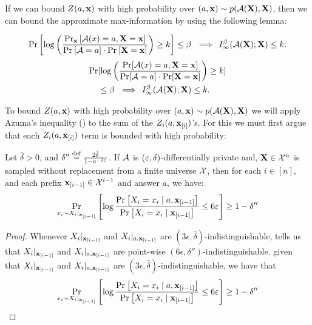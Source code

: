If we can bound $Z(a,\mathbf{x})$ with high probability over $(a,\mathbf{x}) \sim p(\mathcal{A}(\mathbf{X}),\mathbf{X})$, then we can bound the approximate max-information by using the following lemma:

\begin{lemma}
\ifnum{}
$$\operatorname*{\mathrm{Pr}}_{}\left[\log \left( \dfrac
{\operatorname*{\mathrm{Pr}}_{\mathbf{x}}\left[\mathcal{A}(x)=a, \mathbf{X}=\mathbf{x}\right]}
{\operatorname*{\mathrm{Pr}}_{}\left[\mathcal{A} = a\right] \cdot \operatorname*{\mathrm{Pr}}_{}\left[\mathbf{X}=\mathbf{x}\right]}
\right) \geq k\right] \leq \beta \,\,\implies\, I_\infty^\beta(\mathcal{A}(\mathbf{X});\mathbf{X}) \leq k.$$
\else
\begin{align*}
\Pr&[\log \left( \dfrac
{\Pr[\mathcal{A}(x)=a, \mathbf{X}=\mathbf{x}]}
{\Pr[\mathcal{A} = a] \cdot \Pr[\mathbf{X}=\mathbf{x}]}
\right) \geq k] \\
& \leq \beta \,\,\implies\, I_\infty^\beta(\mathcal{A}(\mathbf{X});\mathbf{X}) \leq k.
\end{align*}
\fi
\label{lem:boundmaxinfo}
\end{lemma}

To bound $Z(a,\mathbf{x})$ with high probability over $(a,\mathbf{x}) \sim p(\mathcal{A}(\mathbf{X}),\mathbf{X})$ we will apply Azuma's inequality () to the sum of the $Z_i(a,\mathbf{x}_{[i]})$'s. For this we must first argue that each $Z_i(a,\mathbf{x}_{[i]})$ term is bounded with high probability:
\begin{claim}\label{claim:zibound}
Let $\hat\delta>0$, and $\delta'' \stackrel{\text{def}}{=} \tfrac{2\hat\delta}{1-e^{-3\varepsilon}}$.
If $\mathcal{A}$ is $(\varepsilon,\delta)$-differentially private and, $\mathbf{X} \in \mathcal{X}^n$ is sampled without replacement from a finite universe $\mathcal{X}$, then for each $i \in [n]$, and each prefix $\mathbf{x}_{[i-1]}\in \mathcal{X}^{i-1}$ and answer $a$, we have:
    $$
\operatorname*{\mathrm{Pr}}_{x_i \sim X_i |_{\mathbf{x}_{[i-1]}}}\left[\log\dfrac{\operatorname*{\mathrm{Pr}}_{}\left[X_i = x_i \mid a, \mathbf{x}_{[i-1]}\right]}{\operatorname*{\mathrm{Pr}}_{}\left[X_i = x_i\mid \mathbf{x}_{[i-1]}\right]} \leq 6 \varepsilon \right] \geq 1 - \delta''
$$
\label{claim:Fi}
\end{claim}

\begin{proof}
    Whenever $X_i|_{\mathbf{x}_{[i-1]}}$ and $X_i|_{a,\mathbf{x}_{[i-1]}}$ are $\left(3 \epsilon, \hat{\delta} \right)$-indistinguishable,  tells us that $X_i|_{\mathbf{x}_{[i-1]}}$ and $X_i|_{a,\mathbf{x}_{[i-1]}}$ are point-wise $\left(6 \epsilon, \delta'' \right)$-indistinguishable. \ie given that $X_i|_{\mathbf{x}_{[i-1]}}$ and $X_i|_{a,\mathbf{x}_{[i-1]}}$ are $\left(3 \epsilon, \hat{\delta} \right)$-indistinguishable, we have that 
$$
\operatorname*{\mathrm{Pr}}_{x_i \sim X_i |_{\mathbf{x}_{[i-1]}}}\left[\log\dfrac{\operatorname*{\mathrm{Pr}}_{}\left[X_i = x_i \mid a, \mathbf{x}_{[i-1]}\right]}{\operatorname*{\mathrm{Pr}}_{}\left[X_i = x_i\mid \mathbf{x}_{[i-1]}\right]} \leq 6 \varepsilon \right] \geq 1 - \delta''
$$
\end{proof}


